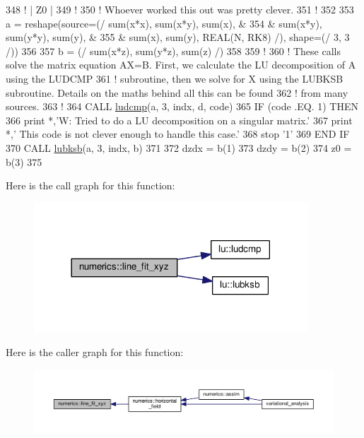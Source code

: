 \begin{DoxyCode}
348 \textcolor{comment}{!     |  Z0  |}
349 \textcolor{comment}{!}
350 \textcolor{comment}{! Whoever worked this out was pretty clever.}
351 \textcolor{comment}{!}
352 
353 a = reshape(source=(/   sum(x*x), sum(x*y), sum(x), &
354 &                       sum(x*y), sum(y*y), sum(y), &
355 &                       sum(x),   sum(y),   \textcolor{keywordtype}{REAL(N, RK8)} /), shape=(/ 3, 3 /))
356 
357 b = (/ sum(x*z), sum(y*z), sum(z) /)
358 
359 \textcolor{comment}{!}
360 \textcolor{comment}{! These calls solve the matrix equation AX=B. First, we calculate the LU decomposition of A using the
       LUDCMP}
361 \textcolor{comment}{! subroutine, then we solve for X using the LUBKSB subroutine. Details on the maths behind all this can be
       found}
362 \textcolor{comment}{! from many sources.}
363 \textcolor{comment}{!}
364 \textcolor{keyword}{CALL }\hyperlink{namespacelu_a578a2275703e9c18d7f262f0a3482fbe}{ludcmp}(a, 3, indx, d, code)
365 \textcolor{keywordflow}{IF} (code .EQ. 1) \textcolor{keywordflow}{THEN}
366     print *,\textcolor{stringliteral}{'W: Tried to do a LU decomposition on a singular matrix.'}
367     print *,\textcolor{stringliteral}{'   This code is not clever enough to handle this case.'}
368     stop \textcolor{stringliteral}{'1'}
369 \textcolor{keywordflow}{END IF}
370 \textcolor{keyword}{CALL }\hyperlink{namespacelu_a588ba20d76e8dd5c49b370d9ba3ec379}{lubksb}(a, 3, indx, b)
371 
372 dzdx = b(1)
373 dzdy = b(2)
374 z0   = b(3)
375 
\end{DoxyCode}


Here is the call graph for this function\+:\nopagebreak
\begin{figure}[H]
\begin{center}
\leavevmode
\includegraphics[width=290pt]{namespacenumerics_a8e58d8bf1c738af1a91517fdb8b81aa2_cgraph}
\end{center}
\end{figure}




Here is the caller graph for this function\+:\nopagebreak
\begin{figure}[H]
\begin{center}
\leavevmode
\includegraphics[width=350pt]{namespacenumerics_a8e58d8bf1c738af1a91517fdb8b81aa2_icgraph}
\end{center}
\end{figure}


